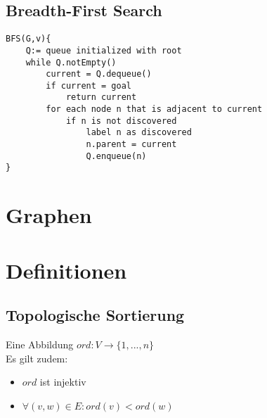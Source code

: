 \documentclass[10pt,a4paper]{article}
\begin{document}
		\subsection{Breadth-First Search}
			\begin{lstlisting}
BFS(G,v){
	Q:= queue initialized with root
	while Q.notEmpty()
		current = Q.dequeue()
		if current = goal
			return current
		for each node n that is adjacent to current
			if n is not discovered
				label n as discovered
				n.parent = current
				Q.enqueue(n)
}
			\end{lstlisting}


\section{Graphen}


\section{Definitionen}
	\subsection{Topologische Sortierung}
		Eine Abbildung $ord:V\rightarrow\{1,...,n\}$	\\
		Es gilt zudem:
		\begin{itemize}
			\item $ord$ ist injektiv
			\item $\forall(v,w)\in E:ord(v)<ord(w)$
		\end{itemize}
		
\end{document}
